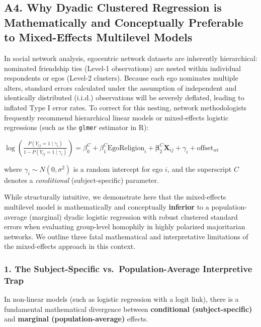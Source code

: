 \documentclass[
  letterpaper,
  DIV=11,
  numbers=noendperiod]{scrartcl}
\begin{document}
\subsection{A4. Why Dyadic Clustered Regression is Mathematically and
Conceptually Preferable to Mixed-Effects Multilevel
Models}\label{a4.-why-dyadic-clustered-regression-is-mathematically-and-conceptually-preferable-to-mixed-effects-multilevel-models}

In social network analysis, egocentric network datasets are inherently
hierarchical: nominated friendship ties (Level-1 observations) are
nested within individual respondents or egos (Level-2 clusters). Because
each ego nominates multiple alters, standard errors calculated under the
assumption of independent and identically distributed (i.i.d.)
observations will be severely deflated, leading to inflated Type I error
rates. To correct for this nesting, network methodologists frequently
recommend hierarchical linear models or mixed-effects logistic
regressions (such as the \texttt{glmer} estimator in R):

\(\log\left(\frac{P(Y_{ij} = 1 \mid \gamma_i)}{1 - P(Y_{ij} = 1 \mid \gamma_i)}\right) = \beta_0^C + \beta_1^C \text{EgoReligion}_i + \mathbf{\beta}_2^C \mathbf{X}_{ij} + \gamma_i + \text{offset}_{wi}\)

where \(\gamma_i \sim N(0, \sigma^2)\) is a random intercept for ego
\(i\), and the superscript \(C\) denotes a \emph{conditional}
(subject-specific) parameter.

While structurally intuitive, we demonstrate here that the mixed-effects
multilevel model is mathematically and conceptually \textbf{inferior} to
a population-average (marginal) dyadic logistic regression with robust
clustered standard errors when evaluating group-level homophily in
highly polarized majoritarian networks. We outline three fatal
mathematical and interpretative limitations of the mixed-effects
approach in this context.

\subsubsection{1. The Subject-Specific vs.~Population-Average
Interpretive
Trap}\label{the-subject-specific-vs.-population-average-interpretive-trap}

In non-linear models (such as logistic regression with a logit link),
there is a fundamental mathematical divergence between
\textbf{conditional (subject-specific)} and \textbf{marginal
(population-average)} effects.
\end{document}
